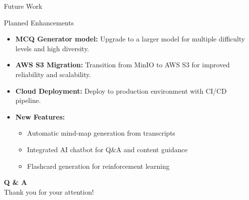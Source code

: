 \documentclass{beamer}
\begin{document}
\begin{frame}{Future Work}

    \begin{block}{Planned Enhancements}
        \begin{itemize}
            \item \textbf{MCQ Generator model:} Upgrade to a larger model for multiple difficulty levels and high diversity.
            \item \textbf{AWS S3 Migration:} Transition from MinIO to AWS S3 for improved reliability and scalability.
            \item \textbf{Cloud Deployment:} Deploy to production environment with CI/CD pipeline.
            \item \textbf{New Features:}
                \begin{itemize}
                    \item Automatic mind-map generation from transcripts
                    \item Integrated AI chatbot for Q\&A and content guidance
                    \item Flashcard generation for reinforcement learning
                \end{itemize}
        \end{itemize}
    \end{block}
\end{frame}

\begin{frame}
    \centering
    \Huge \textbf{Q \& A} \\
    \vspace{1cm}
    \large Thank you for your attention!
\end{frame}
\end{document}
